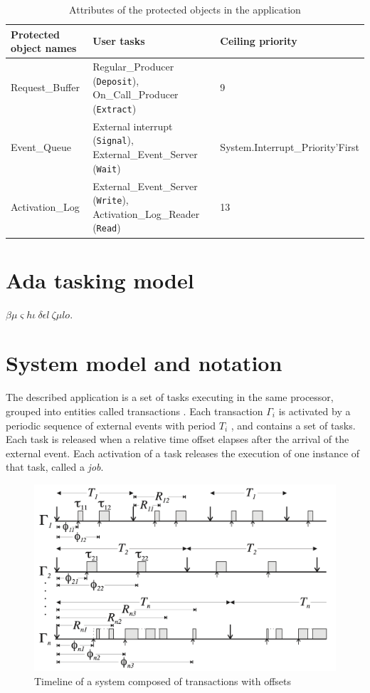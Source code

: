 \documentclass{article}
\begin{document}
\begin{table}[!htbp]
   \centering
   \begin{tabular}{lll}
     \toprule
     Protected object names & User tasks & Ceiling priority  \\
     \midrule
     Request\_Buffer & Regular\_Producer (\texttt{Deposit}), On\_Call\_Producer (\texttt{Extract}) & 9 \\
     Event\_Queue & External interrupt (\texttt{Signal}), External\_Event\_Server (\texttt{Wait}) & System.Interrupt\_Priority'First \\
     Activation\_Log & External\_Event\_Server (\texttt{Write}), Activation\_Log\_Reader (\texttt{Read}) & 13 \\
     \bottomrule
   \end{tabular}
   \caption{Attributes of the protected objects in the application \cite{ycs}}
   \label{tab:po-attributes}
\end{table}

\section{Ada tasking model}

$\beta \mu \varsigma h \iota\ \delta \epsilon l\ \zeta \mu l o$.

\section{System model and notation}\label{model-notation}

The described application is a set of tasks executing in the same processor, grouped into entities called transactions \cite{tindell-offsets}. Each transaction $\Gamma_i$ is activated by a periodic sequence of external events with period $T_i$ , and contains a set of tasks. Each task is released when a relative time offset elapses after the arrival of the external event. Each activation of a task releases the execution of one instance of that task, called a \textit{job}.

\begin{figure}[!htbp]
\centering
\includegraphics[width=5in]{images/transactions}
\caption{Timeline of a system composed of transactions with offsets \cite{pessimistic-rma}}
\label{transactions}
\end{figure}
\end{document}
